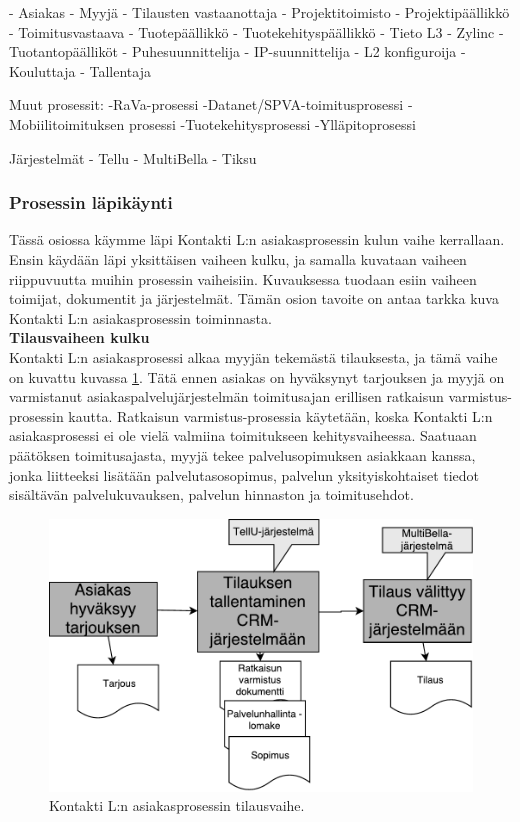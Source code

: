 \documentclass[finnish,12pt,a4paper,pdftex]{article}
\begin{document}
- Asiakas
- Myyjä
- Tilausten vastaanottaja
- Projektitoimisto
- Projektipäällikkö
- Toimitusvastaava
- Tuotepäällikkö
- Tuotekehityspäällikkö
- Tieto L3
- Zylinc
- Tuotantopäälliköt
- Puhesuunnittelija
- IP-suunnittelija
- L2 konfiguroija
- Kouluttaja
- Tallentaja

Muut prosessit:
-RaVa-prosessi
-Datanet/SPVA-toimitusprosessi
-Mobiilitoimituksen prosessi
-Tuotekehitysprosessi
-Ylläpitoprosessi

Järjestelmät
- Tellu
- MultiBella
- Tiksu


\subsubsection{Prosessin läpikäynti}

Tässä osiossa käymme läpi Kontakti L:n asiakasprosessin kulun vaihe kerrallaan. Ensin käydään läpi yksittäisen vaiheen kulku, ja samalla kuvataan vaiheen riippuvuutta muihin prosessin vaiheisiin. Kuvauksessa tuodaan esiin vaiheen toimijat, dokumentit ja järjestelmät. Tämän osion tavoite on antaa tarkka kuva Kontakti L:n asiakasprosessin toiminnasta. \\

\textbf{Tilausvaiheen kulku}\\


Kontakti L:n asiakasprosessi alkaa myyjän tekemästä tilauksesta, ja tämä vaihe on kuvattu kuvassa \ref{fig:tilaus}. Tätä ennen asiakas on hyväksynyt tarjouksen ja myyjä on varmistanut asiakaspalvelujärjestelmän toimitusajan erillisen ratkaisun varmistus-prosessin kautta. Ratkaisun varmistus-prosessia käytetään, koska Kontakti L:n asiakasprosessi ei ole vielä valmiina toimitukseen kehitysvaiheessa. Saatuaan päätöksen toimitusajasta, myyjä tekee palvelusopimuksen asiakkaan kanssa, jonka liitteeksi lisätään palvelutasosopimus, palvelun yksityiskohtaiset tiedot sisältävän palvelukuvauksen, palvelun hinnaston ja toimitusehdot.

\begin{figure}[!h]
    \centering
    \includegraphics[scale=0.4]{images/tilaus.pdf}
    \caption{Kontakti L:n asiakasprosessin tilausvaihe.}
    \label{fig:tilaus}
\end{figure}
\end{document}
